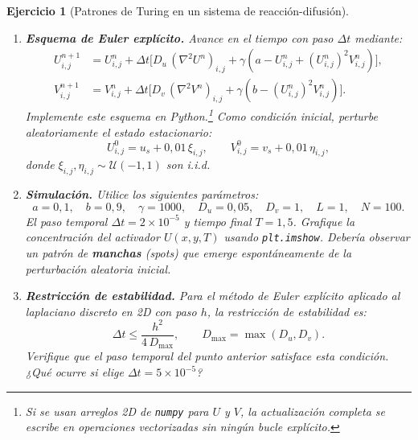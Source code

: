 \documentclass[12pt]{article}
\newtheorem{exercise}{Ejercicio}
\def\dt{\Delta t}
\begin{document}
\begin{exercise}[Patrones de Turing en un sistema de reacción-difusión]
\begin{enumerate}
\textbf{Sugerencia:} En \texttt{numpy}, el laplaciano discreto puede calcularse eficientemente usando \texttt{numpy.roll}:
\begin{verbatim}
  def laplaciano(w, h):
      return (np.roll(w,1,0) + np.roll(w,-1,0)
            + np.roll(w,1,1) + np.roll(w,-1,1) - 4*w) / h**2
\end{verbatim}

\item \textbf{Esquema de Euler explícito.} Avance en el tiempo con paso $\dt$ mediante:
\[
\begin{aligned}
U^{n+1}_{i,j} &= U^{n}_{i,j} + \dt \Big[ D_u\, (\nabla^2 U^n)_{i,j} + \gamma\!\left(a - U^n_{i,j} + (U^n_{i,j})^2 V^n_{i,j}\right) \Big], \\[4pt]
V^{n+1}_{i,j} &= V^{n}_{i,j} + \dt \Big[ D_v\, (\nabla^2 V^n)_{i,j} + \gamma\!\left(b - (U^n_{i,j})^2 V^n_{i,j}\right) \Big].
\end{aligned}
\]
Implemente este esquema en Python.\footnote{Si se usan arreglos 2D de \texttt{numpy} para $U$ y $V$, la actualización completa se escribe en operaciones vectorizadas sin ningún bucle explícito.} Como condición inicial, perturbe aleatoriamente el estado estacionario:
\[
U^0_{i,j} = u_s + 0{,}01\,\xi_{i,j}, \qquad V^0_{i,j} = v_s + 0{,}01\,\eta_{i,j},
\]
donde $\xi_{i,j}, \eta_{i,j} \sim \mathcal{U}(-1, 1)$ son i.i.d.

\item \textbf{Simulación.} Utilice los siguientes parámetros:
\[
a = 0{,}1, \quad b = 0{,}9, \quad \gamma = 1000, \quad D_u = 0{,}05, \quad D_v = 1, \quad L = 1, \quad N = 100.
\]
El paso temporal $\dt = 2 \times 10^{-5}$ y tiempo final $T = 1{,}5$. Grafique la concentración del activador $U(x,y,T)$ usando \texttt{plt.imshow}. Debería observar un patrón de \textbf{manchas} (spots) que emerge espontáneamente de la perturbación aleatoria inicial.

\item \textbf{Restricción de estabilidad.} Para el método de Euler explícito aplicado al laplaciano discreto en 2D con paso $h$, la restricción de estabilidad es:
\[
\dt \leq \frac{h^2}{4\, D_{\max}}, \qquad D_{\max} = \max(D_u, D_v).
\]
Verifique que el paso temporal del punto anterior satisface esta condición. ¿Qué ocurre si elige $\dt = 5 \times 10^{-5}$?


\end{enumerate}
\end{exercise}
\end{document}
